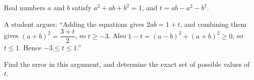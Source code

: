 Real numbers $a$ and $b$ satisfy $a^2+ab+b^2=1$, and $t=ab-a^2-b^2$.

A student argues: ``Adding the equations gives $2ab=1+t$, and combining them gives $(a+b)^2=\dfrac{3+t}{2}$, so $t\ge-3$. Also $1-t=(a-b)^2+(a+b)^2\ge0$, so $t\le1$. Hence $-3\le t\le 1$.''

Find the error in this argument, and determine the exact set of possible values of $t$.

